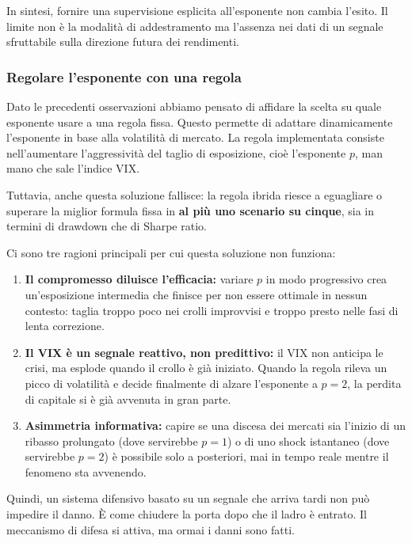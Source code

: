 In sintesi, fornire una supervisione esplicita all'esponente non cambia l'esito.
Il limite non è la modalità di addestramento
ma l'assenza nei dati di un segnale sfruttabile sulla direzione futura dei
rendimenti.



\subsubsection{Regolare l'esponente con una regola}
Dato le precedenti osservazioni abbiamo pensato di affidare la scelta su quale esponente usare a una regola fissa. 
Questo permette di adattare dinamicamente l'esponente in base alla volatilità di mercato. 
La regola implementata consiste nell'aumentare l’aggressività del taglio di esposizione, cioè l'esponente $p$, man mano che sale l’indice VIX.


Tuttavia, anche questa soluzione fallisce: la regola ibrida riesce a eguagliare o superare la miglior formula fissa in \textbf{al più uno scenario su cinque}, sia in termini di drawdown che di Sharpe ratio.

Ci sono tre ragioni principali per cui questa soluzione non funziona:
\begin{enumerate}
    \item \textbf{Il compromesso diluisce l'efficacia:} variare $p$ in modo progressivo crea un'esposizione intermedia che finisce per non essere ottimale in nessun contesto: taglia troppo poco nei crolli improvvisi e troppo presto nelle fasi di lenta correzione.
    \item \textbf{Il VIX è un segnale reattivo, non predittivo:} il VIX non anticipa le crisi, ma esplode quando il crollo è già iniziato. Quando la regola rileva un picco di volatilità e decide finalmente di alzare l'esponente a $p=2$, la perdita di capitale si è già avvenuta in gran parte.
    \item \textbf{Asimmetria informativa:} capire se una discesa dei mercati sia l'inizio di un ribasso prolungato (dove servirebbe $p=1$) o di uno shock istantaneo (dove servirebbe $p=2$) è possibile solo a posteriori, mai in tempo reale mentre il fenomeno sta avvenendo.
\end{enumerate}

Quindi, un sistema difensivo basato su un segnale che arriva tardi non può impedire il danno. 
È come chiudere la porta dopo che il ladro è entrato. 
Il meccanismo di difesa si attiva, ma ormai i danni sono fatti.

